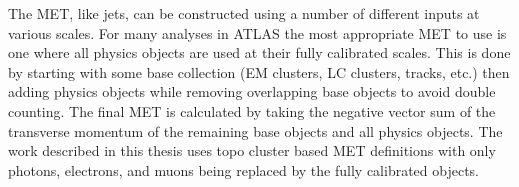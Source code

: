 The MET, like jets, can be constructed using a number of different inputs at various scales.  
For many analyses in ATLAS the most appropriate MET to use is one where all physics objects are used at their fully calibrated scales.  
This is done by starting with some base collection (EM clusters, LC clusters, tracks, etc.) then adding physics objects while removing overlapping base objects to avoid double counting.  
The final MET is calculated by taking the negative vector sum of the transverse momentum of the remaining base objects and all physics objects.  
The work described in this thesis uses topo cluster based MET definitions with only photons, electrons, and muons being replaced by the fully calibrated objects.  




